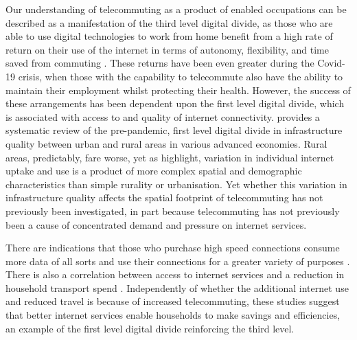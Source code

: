 \documentclass[]{interact}
\theoremstyle{plain}%
\theoremstyle{definition}
\theoremstyle{remark}
\begin{document}
Our understanding of telecommuting as a product of enabled occupations
can be described as a manifestation of the third level digital divide,
as those who are able to use digital technologies to work from home
benefit from a high rate of return on their use of the internet in terms
of autonomy, flexibility, and time saved from commuting
\citep{peters2004employees, siha2006telecommuting, singh2013modeling}.
These returns have been even greater during the Covid-19 crisis, when
those with the capability to telecommute also have the ability to
maintain their employment whilst protecting their health. However, the
success of these arrangements has been dependent upon the first level
digital divide, which is associated with access to and quality of
internet connectivity. \citet{SALEMINK2017360} provides a systematic
review of the pre-pandemic, first level digital divide in infrastructure
quality between urban and rural areas in various advanced economies.
Rural areas, predictably, fare worse, yet as \citet{blank2018local}
highlight, variation in individual internet uptake and use is a product
of more complex spatial and demographic characteristics than simple
rurality or urbanisation. Yet whether this variation in infrastructure
quality affects the spatial footprint of telecommuting has not
previously been investigated, in part because telecommuting has not
previously been a cause of concentrated demand and pressure on internet
services.

There are indications that those who purchase high speed connections
consume more data of all sorts and use their connections for a greater
variety of purposes \citep{hauge2011consumer}. There is also a
correlation between access to internet services and a reduction in
household transport spend \citep{bris2017ict}. Independently of whether
the additional internet use and reduced travel is because of increased
telecommuting, these studies suggest that better internet services
enable households to make savings and efficiencies, an example of the
first level digital divide reinforcing the third level.
\end{document}

